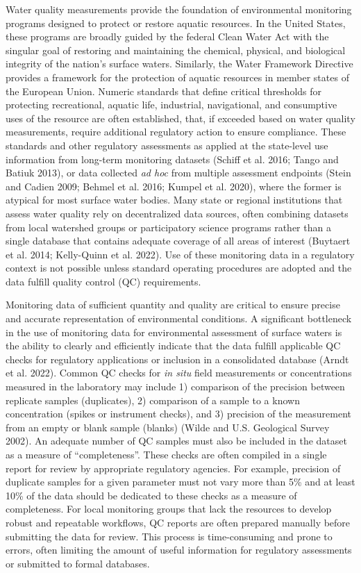 Water quality measurements provide the foundation of environmental monitoring programs designed to protect or restore aquatic resources. In the United States, these programs are broadly guided by the federal Clean Water Act with the singular goal of restoring and maintaining the chemical, physical, and biological integrity of the nation's surface waters. Similarly, the Water Framework Directive provides a framework for the protection of aquatic resources in member states of the European Union. Numeric standards that define critical thresholds for protecting recreational, aquatic life, industrial, navigational, and consumptive uses of the resource are often established, that, if exceeded based on water quality measurements, require additional regulatory action to ensure compliance. These standards and other regulatory assessments as applied at the state-level use information from long-term monitoring datasets (Schiff et al. 2016; Tango and Batiuk 2013), or data collected \emph{ad hoc} from multiple assessment endpoints (Stein and Cadien 2009; Behmel et al. 2016; Kumpel et al. 2020), where the former is atypical for most surface water bodies. Many state or regional institutions that assess water quality rely on decentralized data sources, often combining datasets from local watershed groups or participatory science programs rather than a single database that contains adequate coverage of all areas of interest (Buytaert et al. 2014; Kelly-Quinn et al. 2022). Use of these monitoring data in a regulatory context is not possible unless standard operating procedures are adopted and the data fulfill quality control (QC) requirements.

Monitoring data of sufficient quantity and quality are critical to ensure precise and accurate representation of environmental conditions. A significant bottleneck in the use of monitoring data for environmental assessment of surface waters is the ability to clearly and efficiently indicate that the data fulfill applicable QC checks for regulatory applications or inclusion in a consolidated database (Arndt et al. 2022). Common QC checks for \emph{in situ} field measurements or concentrations measured in the laboratory may include 1) comparison of the precision between replicate samples (duplicates), 2) comparison of a sample to a known concentration (spikes or instrument checks), and 3) precision of the measurement from an empty or blank sample (blanks) (Wilde and U.S. Geological Survey 2002). An adequate number of QC samples must also be included in the dataset as a measure of ``completeness''. These checks are often compiled in a single report for review by appropriate regulatory agencies. For example, precision of duplicate samples for a given parameter must not vary more than 5\% and at least 10\% of the data should be dedicated to these checks as a measure of completeness. For local monitoring groups that lack the resources to develop robust and repeatable workflows, QC reports are often prepared manually before submitting the data for review. This process is time-consuming and prone to errors, often limiting the amount of useful information for regulatory assessments or submitted to formal databases.

